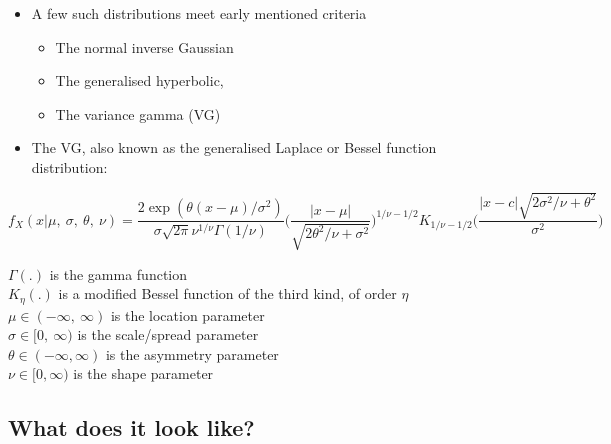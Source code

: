 \documentclass[
  ignorenonframetext,
]{beamer}
\providecommand{\tightlist}{%
  \setlength{\itemsep}{0pt}\setlength{\parskip}{0pt}}
\begin{document}
\begin{frame}{}
\protect\hypertarget{section}{}
\begin{itemize}
\tightlist
\item
  A few such distributions meet early mentioned criteria

  \begin{itemize}
  \tightlist
  \item
    The normal inverse Gaussian
  \item
    The generalised hyperbolic,
  \item
    \alert {The variance gamma (VG)}
  \end{itemize}
\item
  The VG, also known as the generalised Laplace or Bessel function
  distribution:
\end{itemize}

\tiny

\[
f_X(x| \mu,\ \sigma,\ \theta,\ \nu) = 
\frac {2\exp(\theta(x - \mu)/\sigma^2)} {\sigma\sqrt{2\pi} \nu^{1/\nu}\Gamma(1/\nu)} 
\Bigg( \frac {|x - \mu|} {\sqrt{2\theta^2/\nu + \sigma^2}} \Bigg)^{1/\nu - 1/2}K_{1/\nu - 1/2}\Bigg(\frac {|x-c|\sqrt{2\sigma^2/\nu+\theta^2}} {\sigma^2} \Bigg)
\]

\(\Gamma(.)\) is the gamma function\\
\(K_\eta(.)\) is a modified Bessel function of the third kind, of order
\(\eta\)\\
\(\mu \in (-\infty,\ \infty)\) is the location parameter\\
\(\sigma \in [0,\ \infty)\) is the scale/spread parameter\\
\(\theta \in (-\infty, \infty)\) is the asymmetry parameter\\
\(\nu \in [0, \infty)\) is the shape parameter
\end{frame}

\hypertarget{what-does-it-look-like}{%
\subsection{What does it look like?}\label{what-does-it-look-like}}
\end{document}
